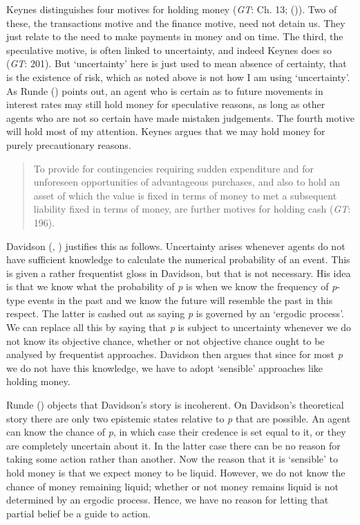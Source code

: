\documentclass[
  11pt,
  letterpaper,
  DIV=11,
  numbers=noendperiod,
  twoside]{scrartcl}
\begin{document}
Keynes distinguishes four motives for holding money (\emph{GT}: Ch. 13;
()). Two of these, the
transactions motive and the finance motive, need not detain us. They
just relate to the need to make payments in money and on time. The
third, the speculative motive, is often linked to uncertainty, and
indeed Keynes does so (\emph{GT}: 201). But `uncertainty' here is just
used to mean absence of certainty, that is the existence of risk, which
as noted above is not how I am using `uncertainty'. As Runde
() points out, an agent who is certain
as to future movements in interest rates may still hold money for
speculative reasons, as long as other agents who are not so certain have
made mistaken judgements. The fourth motive will hold most of my
attention. Keynes argues that we may hold money for purely precautionary
reasons.

\begin{quote}
To provide for contingencies requiring sudden expenditure and for
unforeseen opportunities of advantageous purchases, and also to hold an
asset of which the value is fixed in terms of money to met a subsequent
liability fixed in terms of money, are further motives for holding cash
(\emph{GT}: 196).
\end{quote}

Davidson (,
) justifies this as follows.
Uncertainty arises whenever agents do not have sufficient knowledge to
calculate the numerical probability of an event. This is given a rather
frequentist gloss in Davidson, but that is not necessary. His idea is
that we know what the probability of \emph{p} is when we know the
frequency of \emph{p}-type events in the past and we know the future
will resemble the past in this respect. The latter is cashed out as
saying \emph{p} is governed by an `ergodic process'. We can replace all
this by saying that \emph{p} is subject to uncertainty whenever we do
not know its objective chance, whether or not objective chance ought to
be analysed by frequentist approaches. Davidson then argues that since
for most \emph{p} we do not have this knowledge, we have to adopt
`sensible' approaches like holding money.

Runde () objects that Davidson's story
is incoherent. On Davidson's theoretical story there are only two
epistemic states relative to \emph{p} that are possible. An agent can
know the chance of \emph{p}, in which case their credence is set equal
to it, or they are completely uncertain about it. In the latter case
there can be no reason for taking some action rather than another. Now
the reason that it is `sensible' to hold money is that we expect money
to be liquid. However, we do not know the chance of money remaining
liquid; whether or not money remains liquid is not determined by an
ergodic process. Hence, we have no reason for letting that partial
belief be a guide to action.
\end{document}
